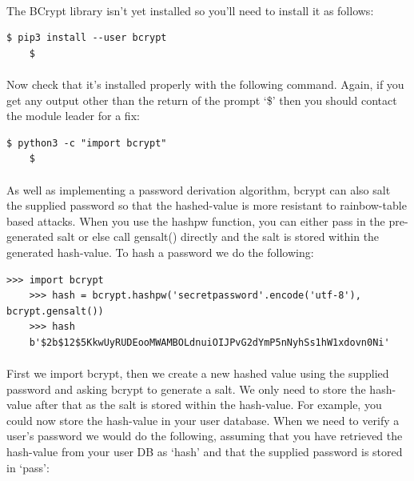 \documentclass[12pt, a4paper, oneside]{book}
\begin{document}
{\paragraph{} The BCrypt library isn't yet installed so you'll need to install it as follows:

\begin{lstlisting}[style=DOS]
    $ pip3 install --user bcrypt
    $
\end{lstlisting}

\paragraph{} Now check that it's installed properly with the following command. Again, if you get any output other than the return of the prompt `\$' then you should contact the module leader for a fix: 
\begin{lstlisting}[style=DOS]
    $ python3 -c "import bcrypt"
    $
\end{lstlisting}

\paragraph{} As well as implementing a password derivation algorithm, bcrypt can also salt the supplied password so that the hashed-value is more resistant to rainbow-table based attacks. When you use the hashpw function, you can either pass in the pre-generated salt or else call gensalt() directly and the salt is stored within the generated hash-value. To hash a password we do the following:

\begin{lstlisting}[style=DOS]
    >>> import bcrypt
    >>> hash = bcrypt.hashpw('secretpassword'.encode('utf-8'), bcrypt.gensalt())
    >>> hash
    b'$2b$12$5KkwUyRUDEooMWAMBOLdnuiOIJPvG2dYmP5nNyhSs1hW1xdovn0Ni'
\end{lstlisting}

\paragraph{} First we import bcrypt, then we create a new hashed value using the supplied password and asking bcrypt to generate a salt. We only need to store the hash-value after that as the salt is stored within the hash-value. For example, you could now store the hash-value in your user database. When we need to verify a user's password we would do the following, assuming that you have retrieved the hash-value from your user DB as `hash' and that the supplied password is stored in `pass':

}
\end{document}
